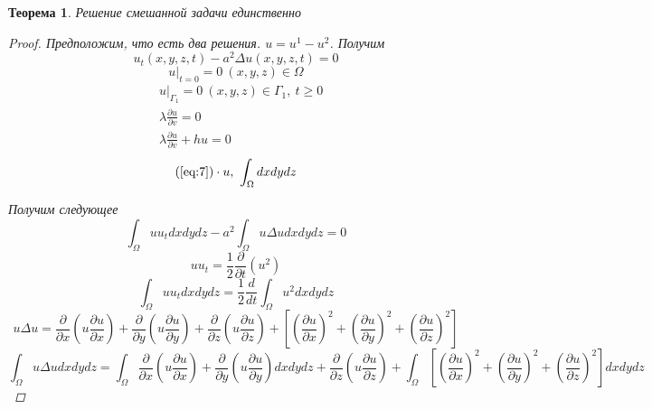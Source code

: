 \documentclass[a4paper]{article}
\newtheorem*{theorem}{Теорема}
\theoremstyle{definition}
\theoremstyle{remark}
\begin{document}
\begin{tcolorbox}[enhanced,breakable,skin first=enhanced,skin middle=enhanced,skin last=enhanced]
    \begin{theorem}
        Решение смешанной задачи единственно
        \begin{proof}
            Предположим, что есть два решения. $ u = u^1 - u^2 $. Получим
            \begin{equation}
                u_t(x,y,z,t) - a^2 \Delta u(x,y,z,t) = 0
                \label{eq:7}
            \end{equation}
            \begin{equation}
                u|_{t=0} = 0 \ (x,y,z) \in \Omega
            \end{equation}
            \begin{subequations}
                \begin{align}
                &u|_{\Gamma_1} = 0 \ (x,y,z) \in \Gamma_1, \ t \geq 0\\
                &\lambda \frac{\partial u}{\partial v} = 0\\
                &\lambda \frac{\partial u}{\partial v} + hu = 0
                \end{align}
            \end{subequations}
            \[
                (\ref{eq:7}) \cdot u, \ \int_{\Omega} dx dy dz
            \]

            Получим следующее
            \begin{equation}
                \int_\Omega u u_t dx dy dz - a^2 \int_\Omega u \Delta u dxdydz = 0
                \label{eq:10}
            \end{equation}
            \[
                u u_t = \frac{1}{2} \frac{\partial}{\partial t} (u^2)
            \]
            \[
                \int_\Omega u u_t dxdydz = \frac{1}{2} \frac{d}{dt} \int_{\Omega}
                u^2 dxdydz
            \]
            \[
                u \Delta u = \frac{\partial}{\partial x} \left( u \frac{\partial u}{\partial x} 
                \right) + \frac{\partial}{\partial y} \left( u \frac{\partial u}{\partial y} 
                \right) + \frac{\partial}{\partial z} \left( u \frac{\partial u}{\partial z} 
                \right) + \left[ \left( \frac{\partial u}{\partial x} \right)^2
                    + \left( \frac{\partial u}{\partial y} \right)^2 +
                \left( \frac{\partial u}{\partial z} \right)^2 \right]
            \]
            \[
                \int_{\Omega} u \Delta u dxdydz
                = \int_{\Omega}\frac{\partial}{\partial x} \left( u \frac{\partial u}{\partial x} 
                \right) + \frac{\partial}{\partial y} \left( u \frac{\partial u}{\partial y} 
                \right)dxdydz
                + \frac{\partial}{\partial z} \left( u \frac{\partial u}{\partial z} 
                \right) + \int_{\Omega}\left[ \left( \frac{\partial u}{\partial x} \right)^2
                    + \left( \frac{\partial u}{\partial y} \right)^2 +
                \left( \frac{\partial u}{\partial z} \right)^2 \right] dxdydz
            \]


\end{proof}
\end{theorem}
\end{tcolorbox}
\end{document}
